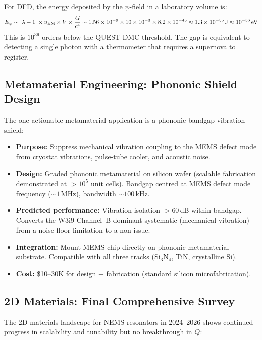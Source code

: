 \documentclass[11pt]{article}
\theoremstyle{definition}
\theoremstyle{remark}
\newcommand{\ee}[1]{\times 10^{#1}}
\begin{document}
For DFD, the energy deposited by the $\psi$-field in a laboratory
volume is:
\begin{equation}
E_\psi \sim |\lambda - 1| \times u_{\rm EM} \times V \times
\frac{G}{c^4} \sim 1.56\ee{-9} \times 10 \times 10^{-3} \times
8.2\ee{-45} \approx 1.3\ee{-55}\,\text{J} \approx 10^{-36}\,\text{eV}
\label{eq:he3_signal}
\end{equation}
This is $10^{39}$ orders below the QUEST-DMC threshold. The gap is
equivalent to detecting a single photon with a thermometer that requires
a supernova to register.


\subsection{Metamaterial Engineering: Phononic Shield Design}

The one actionable metamaterial application is a phononic bandgap
vibration shield:

\begin{itemize}[nosep]
\item \textbf{Purpose:} Suppress mechanical vibration coupling to the
  MEMS defect mode from cryostat vibrations, pulse-tube cooler, and
  acoustic noise.
\item \textbf{Design:} Graded phononic metamaterial on silicon wafer
  (scalable fabrication demonstrated at $> 10^5$ unit cells). Bandgap
  centred at MEMS defect mode frequency ($\sim 1$\,MHz), bandwidth
  $\sim 100$\,kHz.
\item \textbf{Predicted performance:} Vibration isolation $> 60$\,dB
  within bandgap. Converts the W3i9 Channel~B dominant systematic
  (mechanical vibration) from a noise floor limitation to a
  non-issue.
\item \textbf{Integration:} Mount MEMS chip directly on phononic
  metamaterial substrate. Compatible with all three tracks
  (Si$_3$N$_4$, TiN, crystalline Si).
\item \textbf{Cost:} \$10--30K for design + fabrication (standard
  silicon microfabrication).
\end{itemize}


\subsection{2D Materials: Final Comprehensive Survey}

The 2D materials landscape for NEMS resonators in 2024--2026 shows
continued progress in scalability and tunability but no breakthrough
in $Q$:
\end{document}
